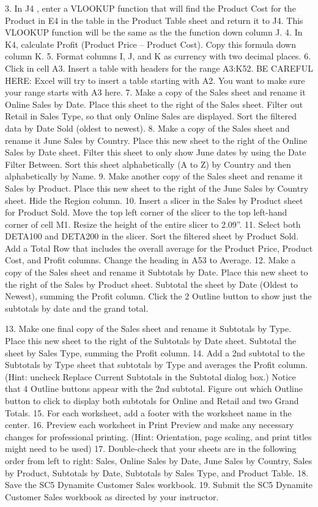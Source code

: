 3. In J4 , enter a VLOOKUP function that will find the Product Cost for the Product in E4 in the
table in the Product Table sheet and return it to J4. This VLOOKUP function will be the same as
the %
the function down column J.
4. In K4, calculate Profit (Product Price – Product Cost). Copy this formula down column K.
5. Format columns I, J, and K as currency with two decimal places.
6. Click in cell A3. Insert a table with headers for the range A3:K52. BE CAREFUL HERE: Excel
will try to insert a table starting with A2. You want to make sure your range starts with A3 here.
7. Make a copy of the Sales sheet and rename it Online Sales by Date. Place this sheet to the right
of the Sales sheet. Filter out Retail in Sales Type, so that only Online Sales are displayed. Sort the
filtered data by Date Sold (oldest to newest).
8. Make a copy of the Sales sheet and rename it June Sales by Country. Place this new sheet to the
right of the Online Sales by Date sheet. Filter this sheet to only show June dates by using the
Date Filter Between. Sort this sheet alphabetically (A to Z) by Country and then alphabetically
by Name.
9. Make another copy of the Sales sheet and rename it Sales by Product. Place this new sheet to
the right of the June Sales by Country sheet. Hide the Region column.
10. Insert a slicer in the Sales by Product sheet for Product Sold. Move the top left corner of the
slicer to the top left-hand corner of cell M1. Resize the height of the entire slicer to 2.09”.
11. Select both DETA100 and DETA200 in the slicer. Sort the filtered sheet by Product Sold. Add a
Total Row that includes the overall average for the Product Price, Product Cost, and Profit
columns. Change the heading in A53 to Average.
12. Make a copy of the Sales sheet and rename it Subtotals by Date. Place this new sheet to the
right of the Sales by Product sheet. Subtotal the sheet by Date (Oldest to Newest), summing the
Profit column. Click the 2 Outline button to show just the subtotals by date and the grand total.


13. Make one final copy of the Sales sheet and rename it Subtotals by Type. Place this new sheet to
the right of the Subtotals by Date sheet. Subtotal the sheet by Sales Type, summing the Profit
column.
14. Add a 2nd subtotal to the Subtotals by Type sheet that subtotals by Type and averages the Profit
column. (Hint: uncheck Replace Current Subtotals in the Subtotal dialog box.) Notice that 4
Outline buttons appear with the 2nd subtotal. Figure out which Outline button to click to
display both subtotals for Online and Retail and two Grand Totals.
15. For each worksheet, add a footer with the worksheet name in the center.
16. Preview each worksheet in Print Preview and make any necessary changes for professional
printing. (Hint: Orientation, page scaling, and print titles might need to be used)
17. Double-check that your sheets are in the following order from left to right: Sales, Online Sales
by Date, June Sales by Country, Sales by Product, Subtotals by Date, Subtotals by Sales Type,
and Product Table.
18. Save the SC5 Dynamite Customer Sales workbook.
19. Submit the SC5 Dynamite Customer Sales workbook as directed by your instructor.

